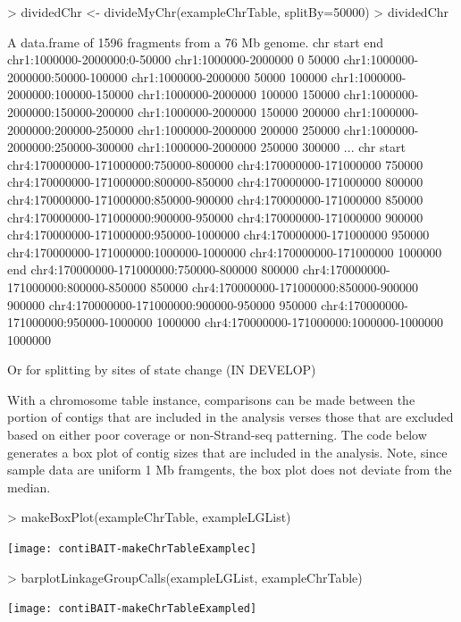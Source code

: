 \documentclass{article}
\begin{document}
\begin{Schunk}
\begin{Sinput}
> dividedChr <- divideMyChr(exampleChrTable, splitBy=50000)
> dividedChr
\end{Sinput}
\begin{Soutput}
A data.frame of 1596 fragments from a  76 Mb genome.
                                                    chr  start    end
chr1:1000000-2000000:0-50000       chr1:1000000-2000000      0  50000
chr1:1000000-2000000:50000-100000  chr1:1000000-2000000  50000 100000
chr1:1000000-2000000:100000-150000 chr1:1000000-2000000 100000 150000
chr1:1000000-2000000:150000-200000 chr1:1000000-2000000 150000 200000
chr1:1000000-2000000:200000-250000 chr1:1000000-2000000 200000 250000
chr1:1000000-2000000:250000-300000 chr1:1000000-2000000 250000 300000
...                                                              chr   start
chr4:170000000-171000000:750000-800000   chr4:170000000-171000000  750000
chr4:170000000-171000000:800000-850000   chr4:170000000-171000000  800000
chr4:170000000-171000000:850000-900000   chr4:170000000-171000000  850000
chr4:170000000-171000000:900000-950000   chr4:170000000-171000000  900000
chr4:170000000-171000000:950000-1000000  chr4:170000000-171000000  950000
chr4:170000000-171000000:1000000-1000000 chr4:170000000-171000000 1000000
                                             end
chr4:170000000-171000000:750000-800000    800000
chr4:170000000-171000000:800000-850000    850000
chr4:170000000-171000000:850000-900000    900000
chr4:170000000-171000000:900000-950000    950000
chr4:170000000-171000000:950000-1000000  1000000
chr4:170000000-171000000:1000000-1000000 1000000
\end{Soutput}
\end{Schunk}

Or for splitting by sites of state change (IN DEVELOP)

With a chromosome table instance, comparisons can be made between the portion of contigs that are included in the analysis verses those that are excluded based on either poor coverage or non-Strand-seq patterning.  The code below generates a box plot of contig sizes that are included in the analysis. Note, since sample data are uniform 1 Mb framgents, the box plot does not deviate from the median.

\begin{Schunk}
\begin{Sinput}
> makeBoxPlot(exampleChrTable, exampleLGList)
\end{Sinput}
\end{Schunk}
\texttt{[image: contiBAIT-makeChrTableExamplec]}



\begin{Schunk}
\begin{Sinput}
> barplotLinkageGroupCalls(exampleLGList, exampleChrTable)
\end{Sinput}
\end{Schunk}
\texttt{[image: contiBAIT-makeChrTableExampled]}
\end{document}
